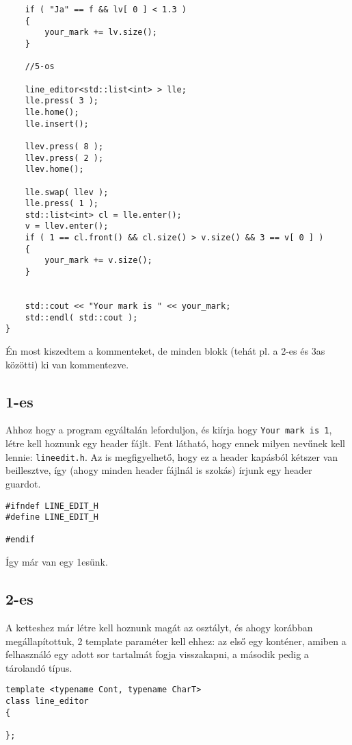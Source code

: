 \documentclass[a4paper,11.5pt,table]{article}
\begin{document}
\begin{lstlisting}
	if ( "Ja" == f && lv[ 0 ] < 1.3 )
	{
		your_mark += lv.size();
	}
	
	//5-os
	
	line_editor<std::list<int> > lle;
	lle.press( 3 );
	lle.home();
	lle.insert();
	
	llev.press( 8 );
	llev.press( 2 );
	llev.home();
	
	lle.swap( llev );
	lle.press( 1 );
	std::list<int> cl = lle.enter();
	v = llev.enter();
	if ( 1 == cl.front() && cl.size() > v.size() && 3 == v[ 0 ] )
	{
		your_mark += v.size();
	}
	
	
	std::cout << "Your mark is " << your_mark;
	std::endl( std::cout );
}
\end{lstlisting}

	\begin{note}
		Én most kiszedtem a kommenteket, de minden blokk (tehát pl. a 2-es és 3as közötti) ki van kommentezve.
	\end{note}
	\subsection{1-es}
	Ahhoz hogy a program egyáltalán leforduljon, és kiírja hogy \texttt{Your mark is 1}, létre kell hoznunk egy header fájlt. Fent látható, hogy ennek milyen nevűnek kell lennie: \texttt{lineedit.h}. Az is megfigyelhető, hogy ez a header kapásból kétszer van beillesztve, így (ahogy minden header fájlnál is szokás) írjunk egy header guardot.
	\begin{lstlisting}
#ifndef LINE_EDIT_H
#define LINE_EDIT_H

#endif 
	\end{lstlisting}
	Így már van egy 1esünk.
	\subsection{2-es}
	A ketteshez már létre kell hoznunk magát az osztályt, és ahogy korábban megállapítottuk, 2 template paraméter kell ehhez: az első egy konténer, amiben a felhasználó egy adott sor tartalmát fogja visszakapni, a második pedig a tárolandó típus.
	\begin{lstlisting}
template <typename Cont, typename CharT>
class line_editor
{

};
	\end{lstlisting}
	
\end{document}
